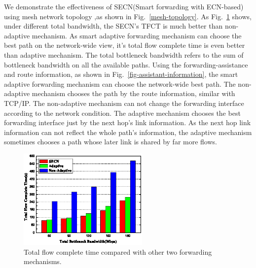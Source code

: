 We demonstrate the effectiveness of SECN(Smart forwarding with ECN-based) using mesh network topology ,as shown in Fig.~\ref{mesh-topology}. As Fig.~\ref{fig-tfct} shows, under different total bandwidth, the SECN's TFCT is much better than non-adaptive mechanism. As smart adaptive forwarding mechanism can choose the best path on the network-wide view, it's total flow complete time is even better than adaptive mechanism. The total bottleneck bandwidth refers to the sum of bottleneck bandwidth on all the available paths. Using the forwarding-assistance and route information, as shown in Fig.~\ref{fig-assistant-information}, the smart adaptive forwarding mechanism can choose the network-wide best path. The non-adaptive mechanism chooses the path by the route information, similar with TCP/IP. The non-adaptive mechanism can not change the forwarding interface according to the network condition. The adaptive mechanism chooses the best forwarding interface just by the next hop's link information. As the next hop link information can not reflect the whole path's information, the adaptive mechanism sometimes chooses a path whose later link is shared by far more flows.

\begin{figure}[t]
\centering
\includegraphics[width=2.5in]{adaptive-pic-cut.eps}
\caption{Total flow complete time compared with other two forwarding mechanisms.}
\label{fig-tfct}
\end{figure}

